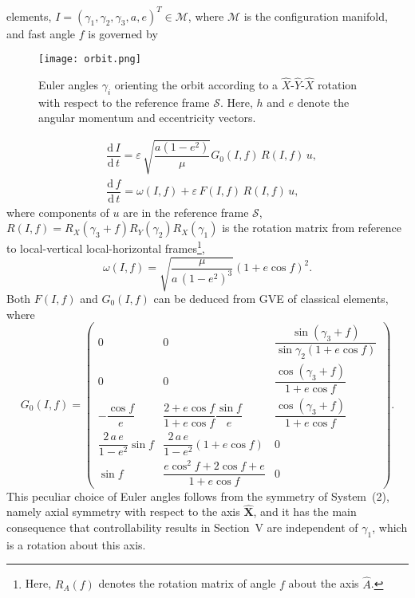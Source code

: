 \documentclass[AMA,STIX1COL]{WileyNJD-v2}
\newcommand{\uvect}[1]{\hat{#1}}
\newcommand{\vect}[1]{#1}
\newcommand{\dt}[1]{\dfrac{\textrm{d} \, #1}{\textrm{d} \, t}}
\renewcommand{\epsilon}{\varepsilon}
\begin{document}
elements, $I = \left( \gamma_1, \gamma_2, \gamma_3, a, e \right)^T \in \mathcal{M}$, where $\mathcal{M}$ is the
configuration manifold, and fast angle $f$ is governed by
\begin{figure}
	\centering
	\texttt{[image: orbit.png]}
	\caption{Euler angles $\gamma_i$ orienting the orbit according to a $\uvect{X}$-$\uvect{Y}$-$\uvect{X}$ rotation  with respect to the reference frame $\mathcal{S}$. Here, $\vect{h}$ and $\vect{e}$ denote the angular momentum and eccentricity vectors.}
	\label{fig:orbit}
\end{figure}
\begin{equation}
	\label{eq:syst_gve}
	\begin{aligned}
		& \dt{I} = \epsilon  \, \sqrt{\dfrac{a \left( 1 - e^2 \right)}{\mu}} G_0(I, f) \, R(I, f) \, \vect{u},\\
		& \dt{f} = \omega(I, f) +   \epsilon \, F (I, f) \, R(I, f) \, \vect{u},
	\end{aligned} %
\end{equation}
where components of $\vect{u}$ are in the reference frame $\mathcal{S}$, $R(I, f) = R_X(\gamma_3 + f) R_Y(\gamma_2) R_X(\gamma_1)$ is the rotation matrix from reference to local-vertical local-horizontal frames\footnote{Here, $R_A(f)$ denotes the rotation matrix of angle $f$ about the axis $\uvect{A}$.}, 
%
\begin{equation}
	\omega(I, f) = \sqrt{\dfrac{\mu}{a \, (1 - e^2)^3}} (1 + e \cos f)^2.
\end{equation}
%
Both $F(I, f)$ and $G_0(I, f)$ can be deduced from \ac{GVE} of classical elements, where
\begin{equation}
	G_0(I,f) = 
	\begin{pmatrix}
		0 & 0 & \dfrac{\sin \left( \gamma_3 + f \right)}{\sin \gamma_2 (1 + e \cos f)} \\
		0 & 0 & \dfrac{\cos \left( \gamma_3 + f \right)}{1 + e \cos f} \\
		- \dfrac{\cos f}{e} & \dfrac{2 + e \cos f}{1 + e \cos f} \dfrac{\sin f}{e}  & \dfrac{\cos \left( \gamma_3 + f \right)}{1 + e \cos f} \\
		\dfrac{2 \,a \, e}{ 1 - e^2} \sin f & \dfrac{2\, a \, e}{ 1 - e^2} \left( 1 + e \cos f \right) & 0\\
		\sin f & \dfrac{e \cos^2 f + 2 \cos f + e}{1 + e \cos f}  & 0
	\end{pmatrix}.
\end{equation}
%
This peculiar choice of Euler angles follows from the symmetry of System~(2), namely axial symmetry with respect to the axis $\boldsymbol{\hat{X}}$, and it has the main
consequence that controllability results in Section~V are independent of $\gamma_1$, which is a rotation about this axis.
\end{document}
